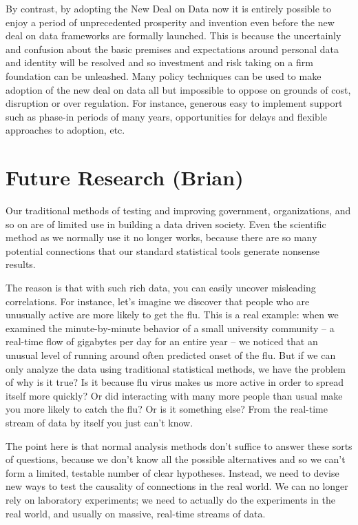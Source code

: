 By contrast, by adopting the New Deal on Data now it is entirely possible to enjoy a period of unprecedented prosperity and invention even before the new deal on data frameworks are formally launched. This is because the uncertainly and confusion about the basic premises and expectations around personal data and identity will be resolved and so investment and risk taking on a firm foundation can be unleashed. Many policy techniques can be used to make adoption of the new deal on data all but impossible to oppose on grounds of cost, disruption or over regulation. For instance, generous easy to implement support such as phase-in periods of many years, opportunities for delays and flexible approaches to adoption, etc.

\section{Future Research (Brian)}

Our traditional methods of testing and improving government, organizations, and so on are of limited use in building a data driven society. Even the scientific method as we normally use it no longer works, because there are so many potential connections that our standard statistical tools generate nonsense results.

The reason is that with such rich data, you can easily uncover misleading correlations. For instance, let’s imagine we discover that people who are unusually active are more likely to get the flu. This is a real example: when we examined the minute-by-minute behavior of a small university community – a real-time flow of gigabytes per day for an entire year – we noticed that an unusual level of running around often predicted onset of the flu. But if we can only analyze the data using traditional statistical methods, we have the problem of why is it true? Is it because flu virus makes us more active in order to spread itself more quickly? Or did interacting with many more people than usual make you more likely to catch the flu? Or is it something else? From the real-time stream of data by itself you just can’t know.

The point here is that normal analysis methods don't suffice to answer these sorts of questions, because we don’t know all the possible alternatives and so we can’t form a limited, testable number of clear hypotheses. Instead, we need to devise new ways to test the causality of connections in the real world. We can no longer rely on laboratory experiments; we need to actually do the experiments in the real world, and usually on massive, real-time streams of data.

